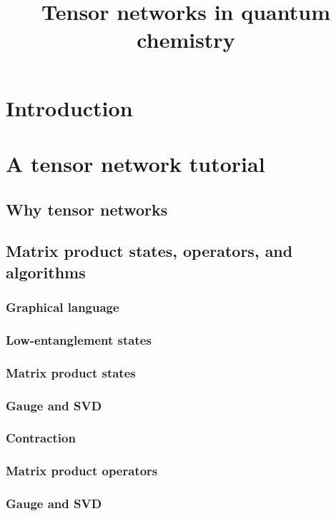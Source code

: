 \documentclass[letterpaper,12pt]{article}
\begin{document}
\title{Tensor networks in quantum chemistry}

\section{Introduction}

\section{A tensor network tutorial}


\subsection{Why tensor networks}

\subsection{Matrix product states, operators, and algorithms}

\subsubsection{Graphical language}
\subsubsection{Low-entanglement states}

\subsubsection{Matrix product states}

\subsubsection{Gauge and SVD}

\subsubsection{Contraction}
\subsubsection{Matrix product operators}

\subsubsection{Gauge and SVD}
\end{document}
